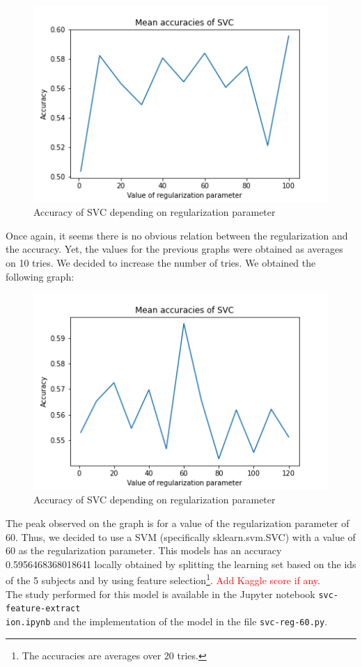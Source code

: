 \documentclass[a4paper, 11pt, oneside]{article}
\begin{document}
\begin{figure}[H]
\centering
\includegraphics[scale=0.4]{svm/svm_svc_accuracies_2.png}
\caption{Accuracy of SVC depending on regularization parameter}
\end{figure}
Once again, it seems there is no obvious relation between the regularization and the accuracy. Yet, the values for the previous graphs were obtained as averages on 10 tries. We decided to increase the number of tries. We obtained the following graph:
\begin{figure}[H]
\centering
\includegraphics[scale=0.4]{svm/svm_svc_accuracies_4.png}
\caption{Accuracy of SVC depending on regularization parameter}
\end{figure}
The peak observed on the graph is for a value of the regularization parameter of 60. Thus, we decided to use a SVM (specifically sklearn.svm.SVC) with a value of 60 as the regularization parameter. This models has an accuracy 0.5956468368018641 locally obtained by splitting the learning set based on the ids of the 5 subjects and by using feature selection\footnote{The accuracies are averages over 20 tries.}. \textcolor{red}{Add Kaggle score if any}.\\
The study performed for this model is available in the Jupyter notebook \texttt{svc-feature-extract\\ion.ipynb} and the implementation of the model in the file \texttt{svc-reg-60.py}.
\end{document}
